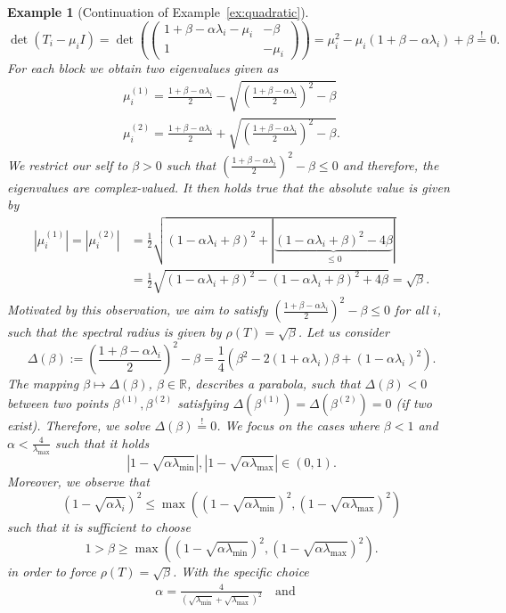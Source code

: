 \documentclass[12pt,openany]{book}
\newtheorem{example}[thm]{Example}
\theoremstyle{definition}
\theoremstyle{definition}
\newcommand{\R}{\mathbb{R}}
\begin{document}
\begin{example}[Continuation of Example~\ref{ex:quadratic}]
\[\det(T_i - \mu_i I) = \det\left(\begin{pmatrix}
1+\beta-\alpha\lambda_i -\mu_i & -\beta \\ 1 & -\mu_i
\end{pmatrix}\right) = \mu_i^2 - \mu_i(1+\beta -\alpha \lambda_i)+\beta \overset{!}{=} 0.\]
For each block we obtain two eigenvalues given as
\begin{align*}
\mu_i^{(1)} = \frac{1+\beta-\alpha\lambda_i}{2} - \sqrt{\left(\frac{1+\beta-\alpha\lambda_i}{2}\right)^2 - \beta}\\
\mu_i^{(2)} = \frac{1+\beta-\alpha\lambda_i}{2} + \sqrt{\left(\frac{1+\beta-\alpha\lambda_i}{2}\right)^2 - \beta}.
\end{align*}
We restrict our self to $\beta>0$ such that $\left(\frac{1+\beta-\alpha\lambda_i}{2}\right)^2 - \beta\le 0$ and therefore, the eigenvalues are complex-valued. It then holds true that the absolute value is given by
\begin{align*} 
|\mu_i^{(1)}| = |\mu_i^{(2)}| &= \frac{1}{2}\sqrt{(1-\alpha\lambda_i+\beta)^2 + |\underbrace{(1-\alpha\lambda_i+\beta)^2-4\beta}_{\le0}|}\\ &= \frac{1}{2}\sqrt{(1-\alpha\lambda_i+\beta)^2 - (1-\alpha\lambda_i+\beta)^2+4\beta} = \sqrt{\beta}. 
\end{align*}
Motivated by this observation, we aim to satisfy $\left(\frac{1+\beta-\alpha\lambda_i}{2}\right)^2 - \beta\le 0$ for all $i$, such that the spectral radius is given by $\rho(T)=\sqrt{\beta}$. Let us consider 
\[\Delta(\beta):= \left(\frac{1+\beta-\alpha\lambda_i}{2}\right)^2 - \beta = \frac{1}{4}(\beta^2 - 2(1+\alpha\lambda_i)\beta + (1-\alpha\lambda_i)^2). \]
The mapping $\beta\mapsto\Delta(\beta)$, $\beta\in\R$, describes a parabola, such that $\Delta(\beta)<0$ between two points $\beta^{(1)},\beta^{(2)}$ satisfying $\Delta(\beta^{(1)}) = \Delta(\beta^{(2)}) =0$ (if two exist). Therefore, we solve $\Delta(\beta)\overset{!}{=}0$. We focus on the cases where $\beta<1$ and $\alpha<\frac{4}{\lambda_{\max}}$ such that it holds
\[|1-\sqrt{\alpha \lambda_{\min}}|,|1-\sqrt{\alpha\lambda_{\max}}|\in(0,1). \]
Moreover, we observe that
\[(1-\sqrt{\alpha\lambda_i})^2 \le \max\left((1-\sqrt{\alpha\lambda_{\min}})^2,(1-\sqrt{\alpha\lambda_{\max}})^2\right) \]
such that it is sufficient to choose
\[1>\beta \ge  \max\left((1-\sqrt{\alpha\lambda_{\min}})^2,(1-\sqrt{\alpha\lambda_{\max}})^2\right). \] 
in order to force $\rho(T) = \sqrt{\beta}$. With the specific choice 
\begin{align*}
\alpha = \frac{4}{(\sqrt{\lambda_{\min}}+\sqrt{\lambda_{\max}})^2} \quad \text{and}\quad 

\end{align*}
\end{example}
\end{document}
